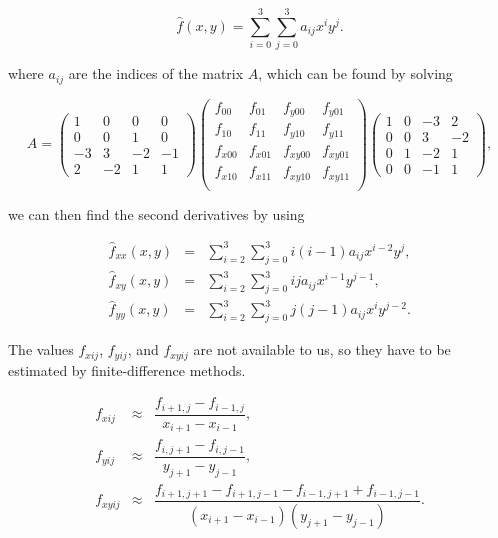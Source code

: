 $$
\hat{f}(x,y) = \sum_{i=0}^3 \sum_{j=0}^3 a_{ij}x^i y^j.
$$

where $a_{ij}$ are the indices of the matrix $A$, which can be found by solving

$$
A = \begin{pmatrix}
    1&0&0&0 \\
    0&0&1&0 \\
    -3&3&-2&-1 \\
    2&-2&1&1
\end{pmatrix} \begin{pmatrix}
    f_{00}&f_{01}&f_{y00}&f_{y01} \\
    f_{10}&f_{11}&f_{y10}&f_{y11} \\
    f_{x00}&f_{x01}&f_{xy00}&f_{xy01} \\
    f_{x10}&f_{x11}&f_{xy10}&f_{xy11} \\
\end{pmatrix} \begin{pmatrix}
    1&0&-3&2 \\
    0&0&3&-2 \\
    0&1&-2&1 \\
    0&0&-1&1
\end{pmatrix},
$$


we can then find the second derivatives by using


$$
\begin{array}{rcl}
    \hat{f}_{xx}(x,y) & = & \sum_{i=2}^3 \sum_{j=0}^3 i (i-1) a_{ij}x^{i-2} y^j, \\
    \hat{f}_{xy}(x,y) & = & \sum_{i=2}^3 \sum_{j=0}^3 i j a_{ij}x^{i-1} y^{j-1}, \\
    \hat{f}_{yy}(x,y) & = & \sum_{i=2}^3 \sum_{j=0}^3 j (j-1) a_{ij}x^{i} y^{j-2}.
\end{array}
$$

The values $f_{xij}$, $f_{yij}$, and $f_{xyij}$ are not available to us, so they have to be estimated by finite-difference methods. 


$$
\begin{array}{rcl}
    f_{xij} & \approx & \dfrac{f_{i+1,j} - f_{i-1,j}}{x_{i+1} - x_{i-1}},  \\
    f_{yij} & \approx & \dfrac{f_{i,j+1} - f_{i,j-1}}{y_{j+1} - y_{j-1}}, \\
    f_{xyij} & \approx & \dfrac{f_{i+1,j+1} - f_{i+1,j-1} - f_{i-1,j+1} + f_{i-1,j-1}}{(x_{i+1} - x_{i-1})(y_{j+1} - y_{j-1})}.
\end{array}
$$


\parencite{choudhary_bicubic_2018}


